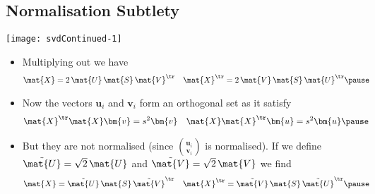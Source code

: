 \begin{slide}
  \section[-1.5]{Normalisation Subtlety}

  \begin{center}
    \texttt{[image: svdContinued-1]}
  \end{center}
    \vspace*{-5mm}
  \begin{PauseHighLight}\squeeze
    \begin{itemize}
    \item Multiplying out we have
    \vspace*{-5mm}
    \begin{align*}
      \mat{X} &= 2\, \mat{U}\,\mat{S}\,\mat{V}^\tr &
      \mat{X}^\tr &=2\,  \mat{V}\,\mat{S}\,\mat{U}^\tr\pause
    \end{align*}
    \vspace*{-15mm}
    
  \item Now the vectors $\bm{u}_i$ and $\bm{v}_i$ form an orthogonal
    set as it  satisfy
    \vspace*{-5mm}
  \begin{align*}
    \mat{X}^\tr \mat{X} \bm{v} &= s^2 \bm{v} &
    \mat{X} \mat{X}^\tr \bm{u} &= s^2 \bm{u}\pause
  \end{align*}
  \vspace*{-15mm}
  
\item But they are not normalised (since $\binom{\bm{u}_i}{\bm{v}_i}$
  is normalised). If we define     $\tilde{\mat{U}} =
  \sqrt{2}\,\mat{U}$ and $\tilde{\mat{V}} = \sqrt{2}\,\mat{V}$
  we find
    \vspace*{-5mm}
  \begin{align*}
    \mat{X}   &=      \tilde{\mat{U}} \,\mat{S}\, \tilde{\mat{V}}^\tr &
    \mat{X}^\tr &= \tilde{\mat{V}} \,\mat{S}\, \tilde{\mat{U}}^\tr\pause
  \end{align*}
\end{itemize}
\end{PauseHighLight}

\end{slide}




